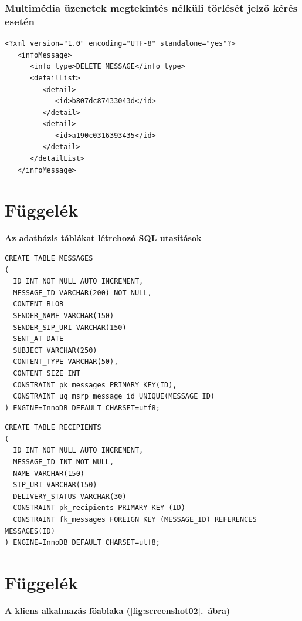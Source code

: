 \subsubsection*{Multimédia üzenetek megtekintés nélküli törlését jelző kérés esetén}
\fontsize{10}{10}
\begin{verbatim}
<?xml version="1.0" encoding="UTF-8" standalone="yes"?>
   <infoMessage>
      <info_type>DELETE_MESSAGE</info_type>
      <detailList>
         <detail>
            <id>b807dc87433043d</id>
         </detail>
         <detail>
            <id>a190c0316393435</id>
         </detail>
      </detailList>
   </infoMessage>
\end{verbatim}
\fontsize{12}{12} 
\newpage 

\section{Függelék}
\label{sec:sql_utasitasok_fuggelek}

\noindent
{\bf Az adatbázis táblákat létrehozó SQL utasítások}

\fontsize{10}{10}
\begin{verbatim}
CREATE TABLE MESSAGES
(
  ID INT NOT NULL AUTO_INCREMENT,
  MESSAGE_ID VARCHAR(200) NOT NULL,
  CONTENT BLOB
  SENDER_NAME VARCHAR(150)
  SENDER_SIP_URI VARCHAR(150)
  SENT_AT DATE
  SUBJECT VARCHAR(250)
  CONTENT_TYPE VARCHAR(50),
  CONTENT_SIZE INT
  CONSTRAINT pk_messages PRIMARY KEY(ID),
  CONSTRAINT uq_msrp_message_id UNIQUE(MESSAGE_ID)
) ENGINE=InnoDB DEFAULT CHARSET=utf8;
\end{verbatim}
\fontsize{12}{12}

\fontsize{10}{10}
\begin{verbatim}
CREATE TABLE RECIPIENTS
(
  ID INT NOT NULL AUTO_INCREMENT,
  MESSAGE_ID INT NOT NULL,
  NAME VARCHAR(150)
  SIP_URI VARCHAR(150)
  DELIVERY_STATUS VARCHAR(30)
  CONSTRAINT pk_recipients PRIMARY KEY (ID)
  CONSTRAINT fk_messages FOREIGN KEY (MESSAGE_ID) REFERENCES MESSAGES(ID)
) ENGINE=InnoDB DEFAULT CHARSET=utf8;
\end{verbatim}
\fontsize{12}{12}

\newpage

\section{Függelék}
\label{sec:kliens_screenshots}

\noindent
{\bf A kliens alkalmazás főablaka (\ref{fig:screenshot02}.~ábra)}

